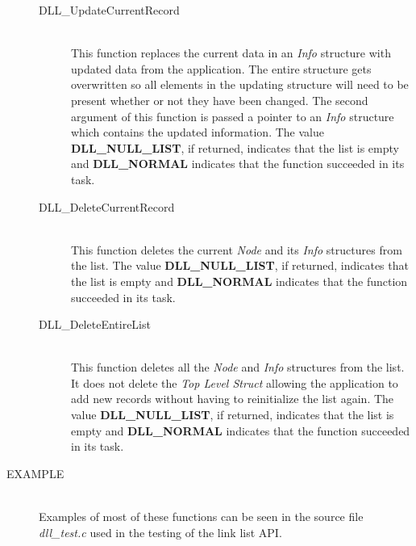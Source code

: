 \documentclass[10pt,letterpaper,titlepage]{article}
\begin{document}
\begin{description}
\begin{description}
\item[DLL\_UpdateCurrentRecord]\quad\\
 This function replaces the current data in an \emph{Info} structure with updated data from the application.  The entire structure gets overwritten so all elements in the updating structure will need to be present whether or not they have been changed.  The second argument of this function is passed a pointer to an \emph{Info} structure which contains the updated information.  The value \textbf{DLL\_NULL\_LIST}, if returned, indicates that the list is empty and \textbf{DLL\_NORMAL} indicates that the function succeeded in its task.

\item[DLL\_DeleteCurrentRecord]\quad\\
 This function deletes the current \emph{Node} and its \emph{Info} structures from the list.  The value \textbf{DLL\_NULL\_LIST}, if returned, indicates that the list is empty and \textbf{DLL\_NORMAL} indicates that the function succeeded in its task.

\item[DLL\_DeleteEntireList]\quad\\
 This function deletes all the \emph{Node} and \emph{Info} structures from the list.  It does not delete the \emph{Top Level Struct} allowing the application to add new records without having to reinitialize the list again.  The value \textbf{DLL\_NULL\_LIST}, if returned, indicates that the list is empty and \textbf{DLL\_NORMAL} indicates that the function succeeded in its task.
\end{description}

\item[EXAMPLE]\quad\\
Examples of most of these functions can be seen in the source file \emph{dll\_test.c} used in the testing of the link list API.

\end{description}
\newpage
\end{document}
